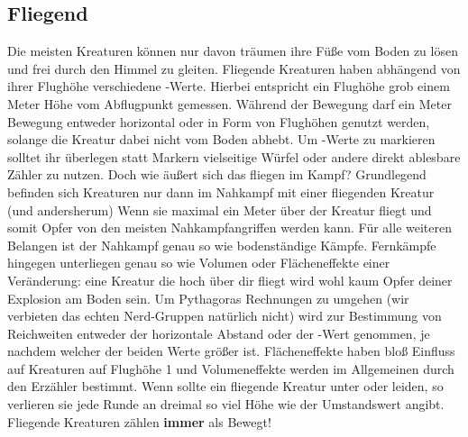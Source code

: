 \subsection*{Fliegend} \label{ef:fliegend}
Die meisten Kreaturen können nur davon träumen ihre Füße vom Boden zu lösen und frei durch den Himmel zu gleiten. Fliegende Kreaturen haben abhängend von ihrer Flughöhe verschiedene \textit{}-Werte. Hierbei entspricht ein Flughöhe grob einem Meter Höhe vom Abflugpunkt gemessen. Während der Bewegung darf ein Meter Bewegung entweder horizontal oder in Form von Flughöhen genutzt werden, solange die Kreatur dabei nicht vom Boden abhebt. Um \textit{}-Werte zu markieren solltet ihr überlegen statt Markern vielseitige Würfel oder andere direkt ablesbare Zähler zu nutzen. Doch wie äußert sich das fliegen im Kampf? Grundlegend befinden sich Kreaturen nur dann im Nahkampf mit einer fliegenden Kreatur (und andersherum) Wenn sie maximal ein Meter über der Kreatur fliegt und somit Opfer von den meisten Nahkampfangriffen werden kann. Für alle weiteren Belangen ist der Nahkampf genau so wie bodenständige Kämpfe. Fernkämpfe hingegen unterliegen genau so wie Volumen oder Flächeneffekte einer Veränderung: eine Kreatur die hoch über dir fliegt wird wohl kaum Opfer deiner Explosion am Boden sein. Um Pythagoras Rechnungen zu umgehen (wir verbieten das echten Nerd-Gruppen natürlich nicht) wird zur Bestimmung von Reichweiten entweder der horizontale Abstand oder der \textit{}-Wert genommen, je nachdem welcher der beiden Werte größer ist. Flächeneffekte haben bloß Einfluss auf Kreaturen auf Flughöhe 1 und Volumeneffekte werden im Allgemeinen durch den Erzähler bestimmt. Wenn sollte ein fliegende Kreatur unter \textit{} oder \textit{} leiden, so verlieren sie jede Runde an dreimal so viel Höhe wie der Umstandswert angibt.\\
Fliegende Kreaturen zählen \textbf{immer} als Bewegt!




